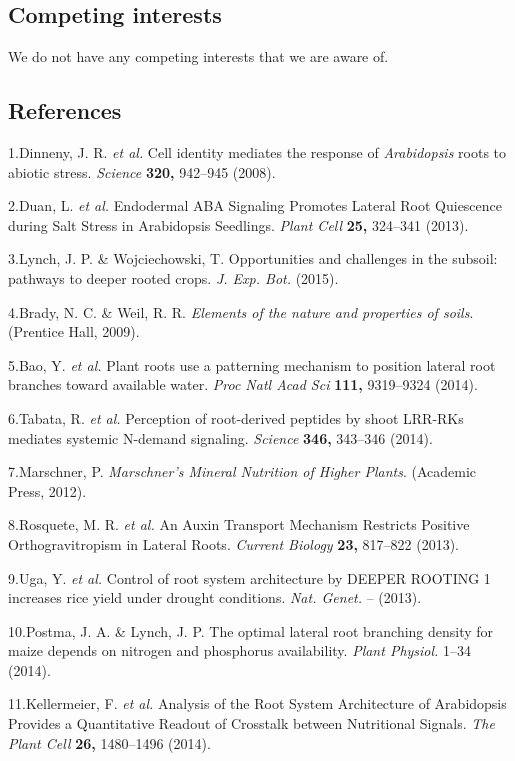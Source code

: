 \documentclass[]{article}
\begin{document}
\subsection{Competing interests}\label{competing-interests}

We do not have any competing interests that we are aware of.

\subsection*{References}\label{references}

1.Dinneny, J. R. \emph{et al.} Cell identity mediates the response of
\emph{Arabidopsis} roots to abiotic stress. \emph{Science} \textbf{320,}
942--945 (2008).

2.Duan, L. \emph{et al.} Endodermal ABA Signaling Promotes Lateral Root
Quiescence during Salt Stress in Arabidopsis Seedlings. \emph{Plant
Cell} \textbf{25,} 324--341 (2013).

3.Lynch, J. P. \& Wojciechowski, T. Opportunities and challenges in the
subsoil: pathways to deeper rooted crops. \emph{J. Exp. Bot.} (2015).

4.Brady, N. C. \& Weil, R. R. \emph{Elements of the nature and
properties of soils}. (Prentice Hall, 2009).

5.Bao, Y. \emph{et al.} Plant roots use a patterning mechanism to
position lateral root branches toward available water. \emph{Proc Natl
Acad Sci} \textbf{111,} 9319--9324 (2014).

6.Tabata, R. \emph{et al.} Perception of root-derived peptides by shoot
LRR-RKs mediates systemic N-demand signaling. \emph{Science}
\textbf{346,} 343--346 (2014).

7.Marschner, P. \emph{Marschner's Mineral Nutrition of Higher Plants}.
(Academic Press, 2012).

8.Rosquete, M. R. \emph{et al.} An Auxin Transport Mechanism Restricts
Positive Orthogravitropism in Lateral Roots. \emph{Current Biology}
\textbf{23,} 817--822 (2013).

9.Uga, Y. \emph{et al.} Control of root system architecture by DEEPER
ROOTING 1 increases rice yield under drought conditions. \emph{Nat.
Genet.} -- (2013).

10.Postma, J. A. \& Lynch, J. P. The optimal lateral root branching
density for maize depends on nitrogen and phosphorus availability.
\emph{Plant Physiol.} 1--34 (2014).

11.Kellermeier, F. \emph{et al.} Analysis of the Root System
Architecture of Arabidopsis Provides a Quantitative Readout of Crosstalk
between Nutritional Signals. \emph{The Plant Cell} \textbf{26,}
1480--1496 (2014).
\end{document}
